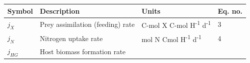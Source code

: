 \documentclass[]{elsarticle} %
\begin{document}
\begin{longtable}[]{@{}llll@{}}
\toprule
\begin{minipage}[b]{0.09\columnwidth}\raggedright\strut
Symbol\strut
\end{minipage} & \begin{minipage}[b]{0.44\columnwidth}\raggedright\strut
Description\strut
\end{minipage} & \begin{minipage}[b]{0.26\columnwidth}\raggedright\strut
Units\strut
\end{minipage} & \begin{minipage}[b]{0.09\columnwidth}\raggedright\strut
Eq. no.\strut
\end{minipage}\tabularnewline
\midrule
\endhead
\begin{minipage}[t]{0.09\columnwidth}\raggedright\strut
\(j_X\)\strut
\end{minipage} & \begin{minipage}[t]{0.44\columnwidth}\raggedright\strut
Prey assimilation (feeding) rate\strut
\end{minipage} & \begin{minipage}[t]{0.26\columnwidth}\raggedright\strut
C-mol X C-mol H\textsuperscript{-1} d\textsuperscript{-1}\strut
\end{minipage} & \begin{minipage}[t]{0.09\columnwidth}\raggedright\strut
3\strut
\end{minipage}\tabularnewline
\begin{minipage}[t]{0.09\columnwidth}\raggedright\strut
\(j_N\)\strut
\end{minipage} & \begin{minipage}[t]{0.44\columnwidth}\raggedright\strut
Nitrogen uptake rate\strut
\end{minipage} & \begin{minipage}[t]{0.26\columnwidth}\raggedright\strut
mol N Cmol H\textsuperscript{-1} d\textsuperscript{-1}\strut
\end{minipage} & \begin{minipage}[t]{0.09\columnwidth}\raggedright\strut
4\strut
\end{minipage}\tabularnewline
\begin{minipage}[t]{0.09\columnwidth}\raggedright\strut
\(j_{HG}\)\strut
\end{minipage} & \begin{minipage}[t]{0.44\columnwidth}\raggedright\strut
Host biomass formation rate\strut
\end{minipage} & \begin{minipage}[t]{0.26\columnwidth}\raggedright\strut

\end{minipage}
\end{longtable}
\end{document}
